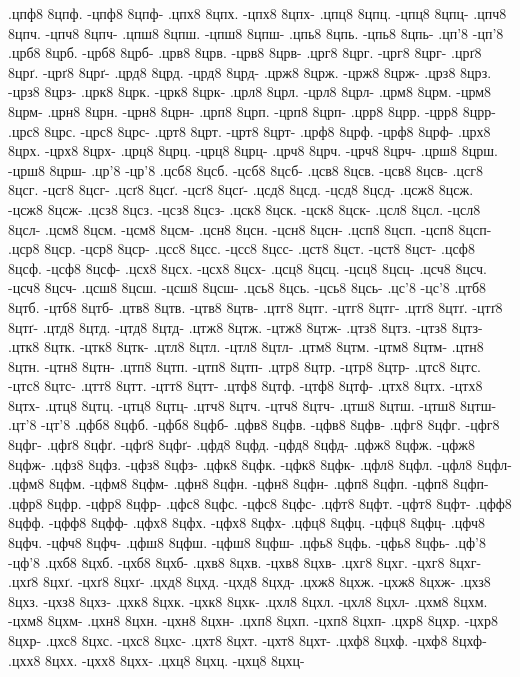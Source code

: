 {.цпф8 8цпф. -цпф8 8цпф-
.цпх8 8цпх. -цпх8 8цпх-
.цпц8 8цпц. -цпц8 8цпц-
.цпч8 8цпч. -цпч8 8цпч-
.цпш8 8цпш. -цпш8 8цпш-
.цпь8 8цпь. -цпь8 8цпь-
.цп'8 -цп'8
.црб8 8црб. -црб8 8црб-
.црв8 8црв. -црв8 8црв-
.црг8 8црг. -црг8 8црг-
.црґ8 8црґ. -црґ8 8црґ-
.црд8 8црд. -црд8 8црд-
.црж8 8црж. -црж8 8црж-
.црз8 8црз. -црз8 8црз-
.црк8 8црк. -црк8 8црк-
.црл8 8црл. -црл8 8црл-
.црм8 8црм. -црм8 8црм-
.црн8 8црн. -црн8 8црн-
.црп8 8црп. -црп8 8црп-
.црр8 8црр. -црр8 8црр-
.црс8 8црс. -црс8 8црс-
.црт8 8црт. -црт8 8црт-
.црф8 8црф. -црф8 8црф-
.црх8 8црх. -црх8 8црх-
.црц8 8црц. -црц8 8црц-
.црч8 8црч. -црч8 8црч-
.црш8 8црш. -црш8 8црш-
.цр'8 -цр'8
.цсб8 8цсб. -цсб8 8цсб-
.цсв8 8цсв. -цсв8 8цсв-
.цсг8 8цсг. -цсг8 8цсг-
.цсґ8 8цсґ. -цсґ8 8цсґ-
.цсд8 8цсд. -цсд8 8цсд-
.цсж8 8цсж. -цсж8 8цсж-
.цсз8 8цсз. -цсз8 8цсз-
.цск8 8цск. -цск8 8цск-
.цсл8 8цсл. -цсл8 8цсл-
.цсм8 8цсм. -цсм8 8цсм-
.цсн8 8цсн. -цсн8 8цсн-
.цсп8 8цсп. -цсп8 8цсп-
.цср8 8цср. -цср8 8цср-
.цсс8 8цсс. -цсс8 8цсс-
.цст8 8цст. -цст8 8цст-
.цсф8 8цсф. -цсф8 8цсф-
.цсх8 8цсх. -цсх8 8цсх-
.цсц8 8цсц. -цсц8 8цсц-
.цсч8 8цсч. -цсч8 8цсч-
.цсш8 8цсш. -цсш8 8цсш-
.цсь8 8цсь. -цсь8 8цсь-
.цс'8 -цс'8
.цтб8 8цтб. -цтб8 8цтб-
.цтв8 8цтв. -цтв8 8цтв-
.цтг8 8цтг. -цтг8 8цтг-
.цтґ8 8цтґ. -цтґ8 8цтґ-
.цтд8 8цтд. -цтд8 8цтд-
.цтж8 8цтж. -цтж8 8цтж-
.цтз8 8цтз. -цтз8 8цтз-
.цтк8 8цтк. -цтк8 8цтк-
.цтл8 8цтл. -цтл8 8цтл-
.цтм8 8цтм. -цтм8 8цтм-
.цтн8 8цтн. -цтн8 8цтн-
.цтп8 8цтп. -цтп8 8цтп-
.цтр8 8цтр. -цтр8 8цтр-
.цтс8 8цтс. -цтс8 8цтс-
.цтт8 8цтт. -цтт8 8цтт-
.цтф8 8цтф. -цтф8 8цтф-
.цтх8 8цтх. -цтх8 8цтх-
.цтц8 8цтц. -цтц8 8цтц-
.цтч8 8цтч. -цтч8 8цтч-
.цтш8 8цтш. -цтш8 8цтш-
.цт'8 -цт'8
.цфб8 8цфб. -цфб8 8цфб-
.цфв8 8цфв. -цфв8 8цфв-
.цфг8 8цфг. -цфг8 8цфг-
.цфґ8 8цфґ. -цфґ8 8цфґ-
.цфд8 8цфд. -цфд8 8цфд-
.цфж8 8цфж. -цфж8 8цфж-
.цфз8 8цфз. -цфз8 8цфз-
.цфк8 8цфк. -цфк8 8цфк-
.цфл8 8цфл. -цфл8 8цфл-
.цфм8 8цфм. -цфм8 8цфм-
.цфн8 8цфн. -цфн8 8цфн-
.цфп8 8цфп. -цфп8 8цфп-
.цфр8 8цфр. -цфр8 8цфр-
.цфс8 8цфс. -цфс8 8цфс-
.цфт8 8цфт. -цфт8 8цфт-
.цфф8 8цфф. -цфф8 8цфф-
.цфх8 8цфх. -цфх8 8цфх-
.цфц8 8цфц. -цфц8 8цфц-
.цфч8 8цфч. -цфч8 8цфч-
.цфш8 8цфш. -цфш8 8цфш-
.цфь8 8цфь. -цфь8 8цфь-
.цф'8 -цф'8
.цхб8 8цхб. -цхб8 8цхб-
.цхв8 8цхв. -цхв8 8цхв-
.цхг8 8цхг. -цхг8 8цхг-
.цхґ8 8цхґ. -цхґ8 8цхґ-
.цхд8 8цхд. -цхд8 8цхд-
.цхж8 8цхж. -цхж8 8цхж-
.цхз8 8цхз. -цхз8 8цхз-
.цхк8 8цхк. -цхк8 8цхк-
.цхл8 8цхл. -цхл8 8цхл-
.цхм8 8цхм. -цхм8 8цхм-
.цхн8 8цхн. -цхн8 8цхн-
.цхп8 8цхп. -цхп8 8цхп-
.цхр8 8цхр. -цхр8 8цхр-
.цхс8 8цхс. -цхс8 8цхс-
.цхт8 8цхт. -цхт8 8цхт-
.цхф8 8цхф. -цхф8 8цхф-
.цхх8 8цхх. -цхх8 8цхх-
.цхц8 8цхц. -цхц8 8цхц-
}
